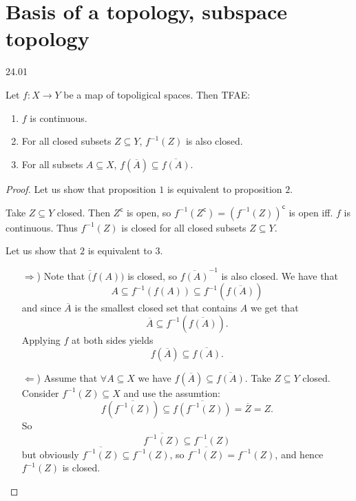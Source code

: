 \section{Basis of a topology, subspace topology}
24.01

\begin{proposition}
  Let \( f: X \to Y \) be a map of topoligical spaces.
  Then TFAE:

  \begin{enumerate}
    \item \( f \) is continuous.
    \item For all closed subsets \( Z \subseteq Y \), \( {f}^{-1} (Z) \) is also closed.
    \item For all subsets \( A \subseteq X \), \( f(\overline{A}) \subseteq \overline{f(A)} \).
  \end{enumerate}
\end{proposition}

\begin{proof}
    Let us show that proposition \( 1 \) is equivalent to proposition \( 2 \).

    Take \( Z \subseteq Y \) closed. Then \( Z^\mathsf{c} \) is open,
    so \( {f}^{-1} (Z^\mathsf{c}) = ({f}^{-1} (Z))^\mathsf{c} \) is open
    iff. \( f \) is continuous. Thus \( {f}^{-1} (Z) \) is closed for all 
    closed subsets \( Z \subseteq Y \).

    Let us show that \( 2 \) is equivalent to \( 3 \).
    \begin{enumerate}
      \item[\( \Rightarrow \))]
        Note that \( \overline(f(A)) \) is closed,
        so \( {\overline{f(A)}}^{-1}  \) is also closed.
        We have that
        \[
          A \subseteq {f}^{-1} (f(A)) \subseteq {f}^{-1} (\overline{f(A)})
        \]
        and since \( \overline{A} \) is the smallest closed
        set that contains \( A \) we get that
        \[
          \overline{A} \subseteq {f}^{-1} (\overline{f(A)}).
        \]
        Applying \( f \) at both sides yields
        \[
          f(\overline{A}) \subseteq \overline{f(A)}.
        \]
      \item[\( \Leftarrow \))]
        Assume that \( \forall A \subseteq X \) we have \( f(\overline{A}) \subseteq \overline{f(A)} \).
        Take \( Z \subseteq Y \) closed. Consider \( {f}^{-1} (Z) \subseteq X \) and use the assumtion:
        \[
          f(\overline{{f}^{-1} (Z)}) \subseteq \overline{ f({f}^{-1} (Z))} = \overline{Z} = Z.
        \]
        So
        \[
          \overline{{f}^{-1} (Z)} \subseteq {f}^{-1} (Z)
        \]
        but obviously \(\overline{{f}^{-1} (Z)} \subseteq {f}^{-1} (Z) \),
        so \( \overline{{f}^{-1} (Z)} = {f}^{-1} (Z) \), and hence
        \( {f}^{-1} (Z)  \) is closed.
    \end{enumerate}
\end{proof}

